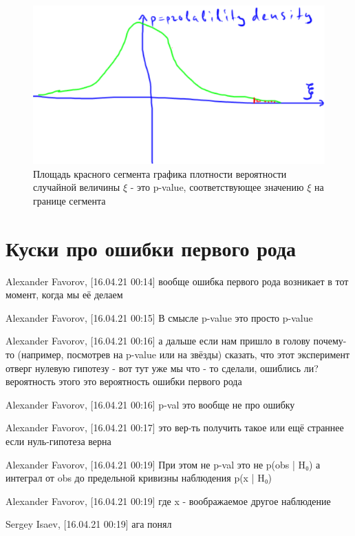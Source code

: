 \documentclass{book}
\begin{document}
\begin{figure}
    \centering
    \includegraphics[scale=.5]{img/p-value.png}
    \caption{Площадь красного сегмента графика плотности вероятности случайной величины $\xi$ - это p-value, соответствующее значению $\xi$ на границе сегмента}
    \label{pval}
\end{figure}




\section*{Куски про ошибки первого рода}


Alexander Favorov, [16.04.21 00:14]
вообще ошибка первого рода возникает в тот момент, когда мы её делаем

Alexander Favorov, [16.04.21 00:15]
В смысле p-value это просто p-value

Alexander Favorov, [16.04.21 00:16]
а дальше если нам пришло в голову почему-то (например, посмотрев на p-value или на звёзды) сказать, что этот эксперимент отверг нулевую гипотезу - вот тут уже мы что - то сделали, ошиблись ли? вероятность этого это вероятность ошибки первого рода

Alexander Favorov, [16.04.21 00:16]
p-val это вообще не про ошибку

Alexander Favorov, [16.04.21 00:17]
это вер-ть получить такое или ещё страннее если нуль-гипотеза верна

Alexander Favorov, [16.04.21 00:19]
При этом не p-val это не  p(obs | H₀) а интеграл от obs до предельной кривизны наблюдения  p(x | H₀)

Alexander Favorov, [16.04.21 00:19]
где x - воображаемое другое наблюдение

Sergey Isaev, [16.04.21 00:19]
ага понял
\end{document}
